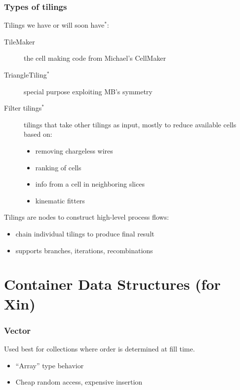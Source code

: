 \documentclass[xcolor=dvipsnames]{beamer}
\begin{document}
\begin{frame}
  \frametitle{Types of tilings}

  Tilings we have or will soon have$^*$:
  \begin{description}
  \item[TileMaker] the cell making code from Michael's CellMaker
  \item[TriangleTiling$^*$] special purpose exploiting MB's symmetry
  \item[Filter tilings$^*$] tilings that take other tilings as input,
    mostly to reduce available cells based on:
    \begin{itemize}
    \item removing chargeless wires
    \item ranking of cells
    \item info from a cell in neighboring slices
    \item kinematic fitters
    \end{itemize}
  \end{description}
  Tilings are nodes to construct high-level process flows:
  \begin{itemize}
  \item chain individual tilings to produce final result
  \item supports branches, iterations, recombinations
  \end{itemize}

\end{frame}


\section{Container Data Structures (for Xin)}

\begin{frame}[fragile]
\end{frame}

\begin{frame}[fragile]
  \frametitle{Vector}

  Used best for collections where order is determined at fill time.
  \begin{itemize}
  \item ``Array'' type behavior
  \item Cheap random access, expensive insertion
  \end{itemize}

  

\end{frame}
\end{document}
